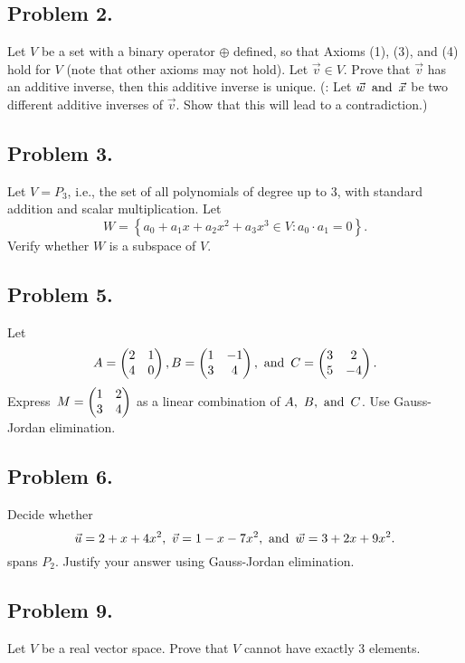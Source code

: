 \subsection*{Problem 2.}
Let $V$ be a set with a binary operator $\oplus$ defined, so that Axioms (1), (3), and (4) hold for $V$ (note that other axioms may not hold). Let $\vec{v} \in V$. Prove that  $\vec{v}$ has an additive inverse, then this additive inverse is unique. (: Let $\vec{w} \operatorname{~\text{and}~} \vec{x}$ be two different additive inverses of $\vec{v}$. Show that this will lead to a contradiction.)

\newpage

\subsection*{Problem 3.}
Let $V = P_3$, i.e., the set of all polynomials of degree up to 3, with standard addition and scalar multiplication. Let
\[
  W = \left\{a_0 + a_1x + a_2x^2 + a_3x^3 \in V : a_0 \cdot a_1 = 0\right\}.
\]
Verify whether $W$ is a subspace of $V$.

\newpage

\subsection*{Problem 5.}
Let
\[
  A = \begin{pmatrix}
    2 & 1 \\
    4 & 0
  \end{pmatrix},
  B = \begin{pmatrix}
    1 & -1 \\
    3 & 4
  \end{pmatrix},
  \operatorname{~\text{and}~} C = \begin{pmatrix}
    3 & 2  \\
    5 & -4
  \end{pmatrix}.
\]
Express $\operatorname{\displaystyle} M = \begin{pmatrix}
    1 & 2 \\
    3 & 4
  \end{pmatrix}$ as a linear combination of $A,~B,\operatorname{~\text{and}~} C$. Use Gauss-Jordan elimination.

\newpage

\subsection*{Problem 6.}
Decide whether
\[
  \vec{u} = 2 + x + 4x^2,~\vec{v} = 1 - x - 7x^2, \operatorname{~\text{and}~} \vec{w} = 3 + 2x + 9x^2.
\]
spans $P_2$. Justify your answer using Gauss-Jordan elimination.

\newpage

\subsection*{Problem 9.}
Let $V$ be a real vector space. Prove that $V$ cannot have exactly 3 elements.

\newpage
